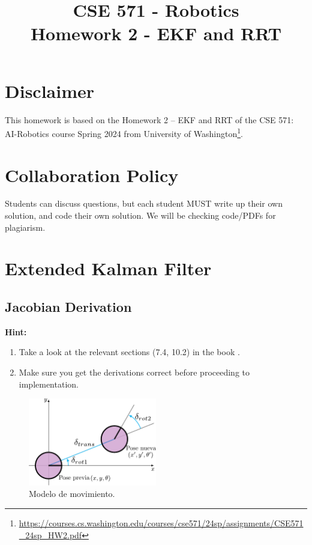 \documentclass[tp]{lcc}
\title{CSE 571 - Robotics \\ Homework 2 - EKF and RRT}
\author{}
\date{}
\begin{document}
\maketitle

\section{Disclaimer}
This homework is based on the Homework 2 -- EKF and RRT of the CSE 571: AI-Robotics course Spring 2024 from University of Washington\footnote{\url{https://courses.cs.washington.edu/courses/cse571/24sp/assignments/CSE571_24sp_HW2.pdf}}.

\section*{Collaboration Policy}
Students can discuss questions, but each student MUST write up their own solution, and code their own solution. We will be checking code/PDFs for plagiarism.

\section{Extended Kalman Filter}

\subsection{Jacobian Derivation}

\textbf{Hint:}
\begin{enumerate}
    \item Take a look at the relevant sections (7.4, 10.2) in the book \cite{thrun2005probabilistic}.
    \item Make sure you get the derivations correct before proceeding to implementation.
\end{enumerate}

\begin{figure}[!htbp]
    \centering
    \includegraphics[width=0.5\textwidth]{./images/odometry_as_controls.pdf}
    \caption{Modelo de movimiento.}
    \label{fig:odometry-base-motion-model}
\end{figure}
\end{document}
